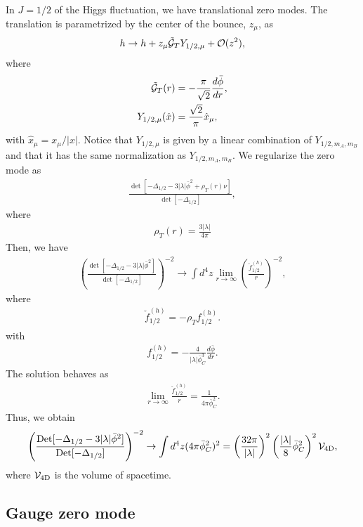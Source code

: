 \documentclass[12pt]{article}
\begin{document}
In $J = 1/2$ of the Higgs fluctuation, we have translational zero modes.
The translation is parametrized by the center of the bounce, $z_\mu$, as
\begin{align}
 h \to h+z_\mu \tilde{\fnc}_T Y_{1/2,\mu}+\mathcal O(z^2),
\end{align}
where
\begin{align}
  \tilde{\fnc}_T(r) & = -\frac{\pi}{\sqrt{2}}\frac{d\bar\phi}{dr}, \\
  Y_{1/2,\mu}(\hat{x}) & = \frac{\sqrt{2}}{\pi}\hat{x}_\mu,
\end{align}
with $\hat{x}_\mu = x_\mu/|x|$.  Notice that $Y_{1/2,\mu}$ is given by
a linear combination of $Y_{1/2,m_A,m_B}$ and that it has the same
normalization as $Y_{1/2,m_A,m_B}$.  We regularize the zero mode as
\begin{align}
 \frac{\det[-\Delta_{1/2}-3|\lambda|\bar\phi^2+\rho_T(r)\nu]}
 {\det[-\Delta_{1/2}]},
\end{align}
where
\begin{align}
 \rho_T(r) = \frac{3|\lambda|}{4\pi}
\end{align}
Then, we have
\begin{align}
 \left(
  \frac{\det[-\Delta_{1/2}-3|\lambda|\bar\phi^2]}{\det[-\Delta_{1/2}]}
 \right)^{-2}\to\int d^4z
 \lim_{r\rightarrow\infty}
 \left(
  \frac{\check f^{(h)}_{1/2}}{r}
 \right)^{-2},
\end{align}
where
\begin{align}
 [-\Delta_{1/2}-3|\lambda|\bar\phi^2]\check f^{(h)}_{1/2} = -\rho_Tf_{1/2}^{(h)}.
\end{align}
with
\begin{align}
 f_{1/2}^{(h)} = -\frac{4}{|\lambda|\bar\phi_C^3}\frac{d\bar\phi}{dr}.
\end{align}
The solution behaves as
\begin{align}
 \lim_{r\to\infty}\frac{\check f^{(h)}_{1/2}}{r} = \frac{1}{4\pi\bar\phi_C^2}.
\end{align}
Thus, we obtain
\begin{align}
 \left(
  \frac{\det[-\Delta_{1/2}-3|\lambda|\bar\phi^2]}{\det[-\Delta_{1/2}]}
 \right)^{-2}\to\int d^4z (4\pi\bar\phi_C^2)^2 =
 \left(
  \frac{32\pi}{|\lambda|}
 \right)^2
 \left(
  \frac{|\lambda|}{8}\bar\phi_C^2
 \right)^2\mathcal V_{\rm 4D},
\end{align}
where $\mathcal V_{\rm 4D}$ is the volume of spacetime.

\subsection{Gauge zero mode}
\end{document}

